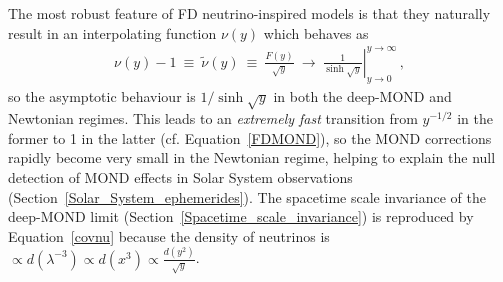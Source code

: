 \documentclass[fleqn,usenatbib,useAMS]{mnras} %
\begin{document}

The most robust feature of FD neutrino-inspired models is that they naturally result in an interpolating function $\nu(y)$ which behaves as
\begin{eqnarray}
	\nu \left( y \right) - 1 ~\equiv~ \widetilde{\nu} \left( y \right) ~\equiv~ \frac{F\left(y\right)}{\sqrt{y}} ~\to~ \left.{\frac{1}{\sinh \sqrt{y}}}\right|_{y \to 0}^{y \to \infty} \, ,
\end{eqnarray}
so the asymptotic behaviour is $1/\sinh\sqrt{y}$ in both the deep-MOND and Newtonian regimes. This leads to an \emph{extremely fast} transition from $y^{-1/2}$ in the former to 1 in the latter (cf. Equation~\ref{FDMOND}), so the MOND corrections rapidly become very small in the Newtonian regime, helping to explain the null detection of MOND effects in Solar System observations (Section~\ref{Solar_System_ephemerides}). The spacetime scale invariance of the deep-MOND limit (Section~\ref{Spacetime_scale_invariance}) is reproduced by Equation~\ref{covnu} because the density of neutrinos is $\propto d (\lambda^{-3}) \propto d(x^3) \propto \frac{d(y^2)}{\sqrt{y}}$.  
\end{document}
